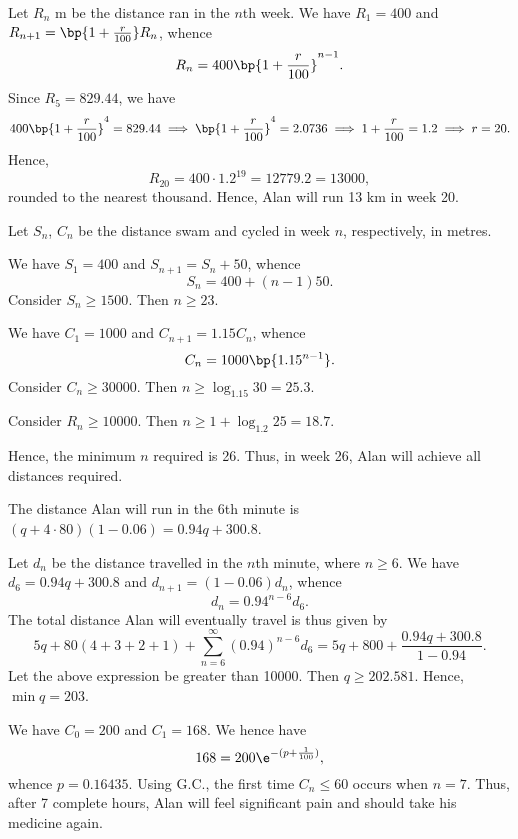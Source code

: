 \begin{solution}
    \begin{ppart}
        Let $R_n$ m be the distance ran in the $n$th week. We have $R_1 = 400$ and $R_{n+1} = \bp{1 + \frac{r}{100}}R_n$, whence \[R_n = 400 \bp{1 + \frac{r}{100}}^{n-1}.\] Since $R_5 = 829.44$, we have \[400 \bp{1 + \frac{r}{100}}^4 = 829.44 \implies \bp{1 + \frac{r}{100}}^4 = 2.0736 \implies 1 + \frac{r}{100} = 1.2 \implies r = 20.\] Hence, \[R_20 = 400 \cdot 1.2^19 = 12779.2 = 13000,\] rounded to the nearest thousand. Hence, Alan will run 13 km in week 20.
    \end{ppart}
    \begin{ppart}
        Let $S_n$, $C_n$ be the distance swam and cycled in week $n$, respectively, in metres.

        We have $S_1 =400$ and $S_{n+1} = S_n + 50$, whence \[S_n = 400 + (n-1)50.\] Consider $S_n \geq 1500$. Then $n \geq 23$.

        We have $C_1 = 1000$ and $C_{n+1} = 1.15 C_n$, whence \[C_n = 1000 \bp{1.15^{n-1}}.\] Consider $C_n \geq 30000$. Then $n \geq \log_{1.15} 30 = 25.3$.

        Consider $R_n \geq 10000$. Then $n \geq 1 + \log_{1.2} 25 = 18.7$.

        Hence, the minimum $n$ required is 26. Thus, in week 26, Alan will achieve all distances required.
    \end{ppart}
    \begin{ppart}
        The distance Alan will run in the 6th minute is $(q + 4 \cdot 80) (1 - 0.06) = 0.94q + 300.8$.

        Let $d_n$ be the distance travelled in the $n$th minute, where $n \geq 6$. We have $d_6 = 0.94 q + 300.8$ and $d_{n+1} = (1-0.06)d_n$, whence \[d_n = 0.94^{n-6} d_6.\] The total distance Alan will eventually travel is thus given by  \[5q + 80(4 + 3 + 2 + 1) + \sum_{n=6}^\infty (0.94)^{n-6} d_6 = 5q + 800 + \frac{0.94q + 300.8}{1 - 0.94}.\] Let the above expression be greater than 10000. Then $q \geq 202.581$. Hence, $\min q = 203$.
    \end{ppart}
    \begin{ppart}
        We have $C_0 = 200$ and $C_1 = 168$. We hence have
        \[168 = 200 \e^{-(p + \frac1{100})},\] whence $p = 0.16435$. Using G.C., the first time $C_n \leq 60$ occurs when $n = 7$. Thus, after 7 complete hours, Alan will feel significant pain and should take his medicine again.
    \end{ppart}
\end{solution}
